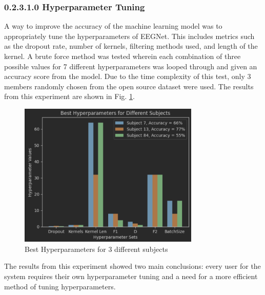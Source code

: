 \documentclass[conference]{IEEEtran}
\begin{document}
        \subsubsection{0.2.3.1.0 Hyperparameter Tuning}
        A way to improve the accuracy of the machine learning model was to appropriately tune the hyperparameters of EEGNet. This includes metrics such as the dropout rate, number of kernels, filtering methods used, and length of the kernel. A brute force method was tested wherein each combination of three possible values for 7 different hyperparameters was looped through and given an accuracy score from the model. Due to the time complexity of this test, only 3 members randomly chosen from the open source dataset were used. The results from this experiment are shown in Fig. \ref{fig:hyperparameter}. 
        \begin{figure}[htbp]
            \centering
            \includegraphics[keepaspectratio, height=2.7in]{figs/paper/hyperparameter_tuning.png}
            \caption{Best Hyperparameters for 3 different subjects}
            \label{fig:hyperparameter}
        \end{figure}
        
        The results from this experiment showed two main conclusions: every user for the system requires their own hyperparameter tuning and a need for a more efficient method of tuning hyperparameters. 
\end{document}
